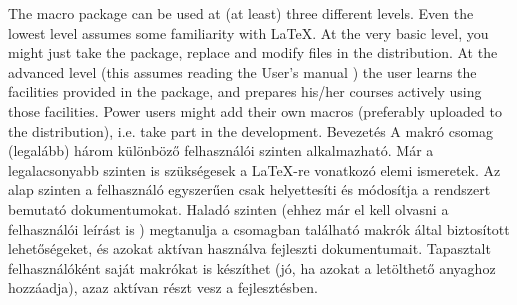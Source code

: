 {
The macro package can be used at (at least) three different levels.
Even the lowest level assumes some familiarity  with \LaTeX.
At the very basic level, you might just take the package,
replace and modify files in the distribution.
At the advanced level (this assumes reading the User's manual \smiley)
the user learns the facilities provided in the package,
and prepares his/her courses actively using those facilities.
Power users might add their own macros (preferably uploaded to the distribution), i.e. take part in the development.
}
{Bevezetés}
{
A makró csomag (legalább) három különböző felhasználói szinten 
alkalmazható. Már a legalacsonyabb szinten is szükségesek a \LaTeX-re
vonatkozó elemi ismeretek.
Az alap szinten a felhasználó egyszerűen csak helyettesíti és módosítja a rendszert bemutató dokumentumokat.
Haladó szinten (ehhez már el kell olvasni a felhasználói leírást is \smiley) megtanulja a csomagban található makrók által biztosított lehetőségeket, és azokat aktívan használva fejleszti dokumentumait.
Tapasztalt felhasználóként saját makrókat is készíthet (jó, ha azokat
a letölthető anyaghoz hozzáadja), azaz aktívan részt vesz a fejlesztésben.
}


